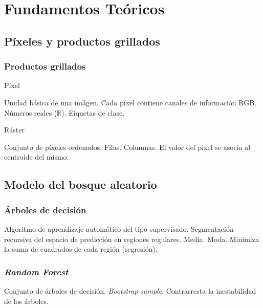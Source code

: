 \documentclass{beamer}
\begin{document}
  \section{Fundamentos Teóricos}

  \subsection*{Píxeles y productos grillados}

  \begin{frame}
    \frametitle{Productos grillados}

    \begin{block}{Píxel}
      \begin{outline}
        \1 Unidad básica de una imágen.
        \1 Cada píxel contiene canales de información
          \2 RGB.
          \2 Números reales ($\mathbb{R}$).
          \2 Eiquetas de clase.
      \end{outline}
    \end{block}

    \begin{block}{Ráster}
      \begin{outline}
        \1 Conjunto de píxeles ordenados.
          \2 Filas.
          \2 Columnas.
        \1 El valor del pixel se asocia al centroide del mismo.
      \end{outline}
    \end{block}
  \end{frame}


  \subsection*{Modelo del bosque aleatorio}

  \begin{frame}
    \frametitle{Árboles de decisión}

    \begin{outline}
      \1  Algoritmo de aprendizaje automático del tipo supervisado.
      \1 Segmentación recursiva del espacio de predicción en regiones regulares.
        \2 Media. 
        \2 Moda.
      \1 Minimiza la suma de cuadrados de cada región (regresión).
    \end{outline}
  \end{frame}

  \begin{frame}
    \frametitle{\textit{Random Forest}}

    \begin{outline}
      \1 Conjunto de árboles de decisión.
        \2 \textit{Bootstrap sample}.
      \1 Contrarresta la inestabilidad de los árboles.
    \end{outline}
  \end{frame}
\end{document}
